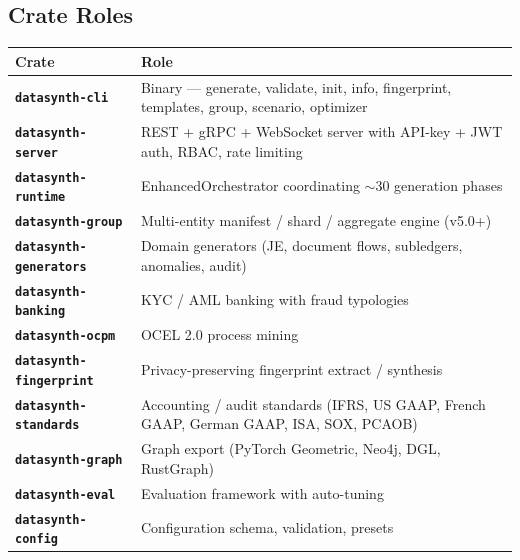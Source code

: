 \documentclass[11pt,a4paper]{article}
\begin{document}
\begin{center}
\end{center}

\subsection{Crate Roles}

\renewcommand{\arraystretch}{1.2}
\begin{tabularx}{\textwidth}{@{}>{\bfseries\color{brand}}l X@{}}
\toprule
\textbf{Crate} & \textbf{Role} \\
\midrule
\texttt{datasynth-cli}             & Binary --- generate, validate, init, info, fingerprint, templates, group, scenario, optimizer \\
\texttt{datasynth-server}          & REST + gRPC + WebSocket server with API-key + JWT auth, RBAC, rate limiting \\
\texttt{datasynth-runtime}         & EnhancedOrchestrator coordinating $\sim$30 generation phases \\
\texttt{datasynth-group}           & Multi-entity manifest / shard / aggregate engine (v5.0+) \\
\texttt{datasynth-generators}      & Domain generators (JE, document flows, subledgers, anomalies, audit) \\
\texttt{datasynth-banking}         & KYC / AML banking with fraud typologies \\
\texttt{datasynth-ocpm}            & OCEL 2.0 process mining \\
\texttt{datasynth-fingerprint}     & Privacy-preserving fingerprint extract / synthesis \\
\texttt{datasynth-standards}       & Accounting / audit standards (IFRS, US GAAP, French GAAP, German GAAP, ISA, SOX, PCAOB) \\
\texttt{datasynth-graph}           & Graph export (PyTorch Geometric, Neo4j, DGL, RustGraph) \\
\texttt{datasynth-eval}            & Evaluation framework with auto-tuning \\
\texttt{datasynth-config}          & Configuration schema, validation, presets \\

\end{tabularx}
\end{document}
